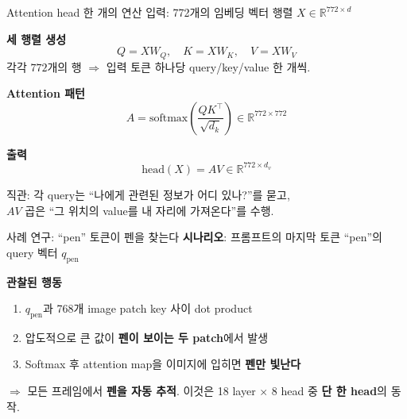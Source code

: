 \documentclass[aspectratio=169,10pt]{beamer}
\begin{document}
\begin{frame}{Attention head 한 개의 연산}
입력: 772개의 임베딩 벡터 행렬 $X \in \mathbb{R}^{772 \times d}$

\vspace{0.5em}
\textbf{세 행렬 생성}
\[
Q = X W_Q, \quad K = X W_K, \quad V = X W_V
\]
각각 $772$개의 행 $\Rightarrow$ 입력 토큰 하나당 query/key/value 한 개씩.

\vspace{0.8em}
\textbf{Attention 패턴}
\[
A = \mathrm{softmax}\!\left(\frac{Q K^\top}{\sqrt{d_k}}\right) \in \mathbb{R}^{772 \times 772}
\]

\textbf{출력}
\[
\mathrm{head}(X) = A V \in \mathbb{R}^{772 \times d_v}
\]

\vspace{0.5em}
\footnotesize
직관: 각 query는 ``나에게 관련된 정보가 어디 있나?''를 묻고,\\
$AV$ 곱은 ``그 위치의 value를 내 자리에 가져온다''를 수행.
\end{frame}

\begin{frame}{사례 연구: ``pen'' 토큰이 펜을 찾는다}
\textbf{시나리오}: 프롬프트의 마지막 토큰 ``pen''의 query 벡터 $q_{\text{pen}}$

\vspace{0.3em}
\textbf{관찰된 행동}
\begin{enumerate}
  \item $q_{\text{pen}}$과 768개 image patch key 사이 dot product
  \item \alert{압도적으로 큰 값}이 \textbf{펜이 보이는 두 patch}에서 발생
  \item Softmax 후 attention map을 이미지에 입히면 \textbf{펜만 빛난다}
\end{enumerate}

\vspace{0.3em}
\begin{center}
\end{center}

\vspace{0.2em}
\footnotesize $\Rightarrow$ 모든 프레임에서 \textbf{펜을 자동 추적}. 이것은 18 layer $\times$ 8 head 중 \textbf{단 한 head}의 동작.
\end{frame}
\end{document}
